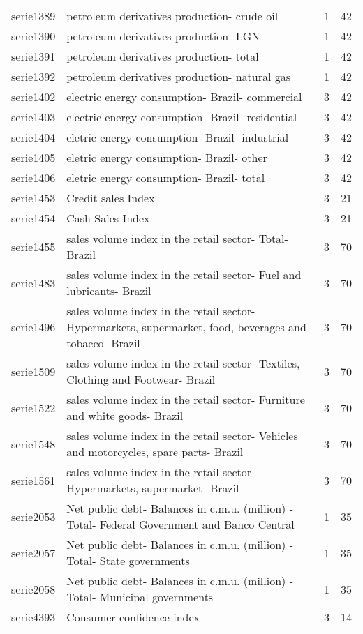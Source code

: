 \documentclass{article}
\begin{document}
\begin{landscape}
\begin{center}
\begin{longtable}{|l|l|l|l|}
serie1389 & petroleum derivatives production- crude oil & 1 & 42 \\
serie1390 & petroleum derivatives production- LGN & 1 & 42 \\
serie1391 & petroleum derivatives production- total & 1 & 42 \\
serie1392 & petroleum derivatives production- natural gas & 1 & 42 \\
serie1402 & electric energy consumption- Brazil- commercial & 3 & 42 \\
serie1403 & electric energy consumption- Brazil- residential & 3 & 42 \\
serie1404 & eletric energy consumption- Brazil- industrial & 3 & 42 \\
serie1405 & eletric energy consumption- Brazil- other & 3 & 42 \\
serie1406 & eletric energy consumption- Brazil- total & 3 & 42 \\
serie1453 & Credit sales Index & 3 & 21 \\
serie1454 & Cash Sales Index & 3 & 21 \\
serie1455 & sales volume index in the retail sector- Total- Brazil & 3 & 70 \\
serie1483 & sales volume index in the retail sector- Fuel and lubricants- Brazil & 3 & 70 \\
serie1496 & sales volume index in the retail sector- Hypermarkets, supermarket, food, beverages and tobacco- Brazil & 3 & 70 \\
serie1509 & sales volume index in the retail sector- Textiles, Clothing and Footwear- Brazil & 3 & 70 \\
serie1522 & sales volume index in the retail sector- Furniture and white goods- Brazil & 3 & 70 \\
serie1548 & sales volume index in the retail sector- Vehicles and motorcycles, spare parts- Brazil & 3 & 70 \\
serie1561 & sales volume index in the retail sector- Hypermarkets, supermarket- Brazil & 3 & 70 \\
serie2053 & Net public debt- Balances in c.m.u. (million) - Total- Federal Government and Banco Central & 1 & 35 \\
serie2057 & Net public debt- Balances in c.m.u. (million) - Total- State governments & 1 & 35 \\
serie2058 & Net public debt- Balances in c.m.u. (million) - Total- Municipal governments & 1 & 35 \\
serie4393 & Consumer confidence index & 3 & 14 \\

\end{longtable}
\end{center}
\end{landscape}
\end{document}
